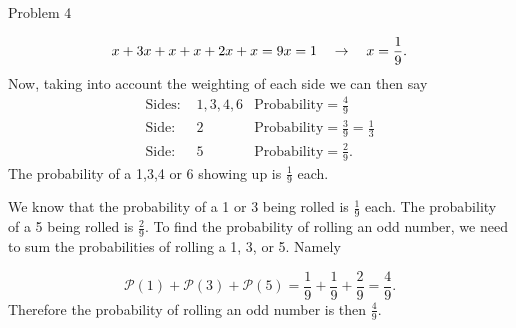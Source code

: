 \begin{problem}{Problem 4}
\begin{highlight}
        \setcounter{equation}{0}
        \begin{equation}
            x + 3x + x + x + 2x + x = 9x = 1 \hspace*{10pt} \rightarrow \hspace*{10pt} x = \frac{1}{9}.
        \end{equation}
        Now, taking into account the weighting of each side we can then say
        \begin{align}
            \text{Sides: } & 1,3,4,6 & \text{Probability} =  \frac{4}{9} \\
            \text{Side: } & 2 & \text{Probability} =  \frac{3}{9} = \frac{1}{3} \\
            \text{Side: } & 5 & \text{Probability} =  \frac{2}{9}.
        \end{align}
        The probability of a 1,3,4 or 6 showing up is $\frac{1}{9}$ each.
    \end{highlight}

    \begin{highlight}
        We know that the probability of a 1 or 3 being rolled is $\frac{1}{9}$ each. The probability of a 5 being rolled is $\frac{2}{9}$. To find the probability of rolling an odd number, we need to 
        sum the probabilities of rolling a 1, 3, or 5. Namely

        \begin{equation}
            \mathcal{P}(1) + \mathcal{P}(3) + \mathcal{P}(5) = \frac{1}{9} + \frac{1}{9} + \frac{2}{9} = \frac{4}{9}.
        \end{equation}
        Therefore the probability of rolling an odd number is then $\frac{4}{9}$.
    \end{highlight}
\end{problem}

